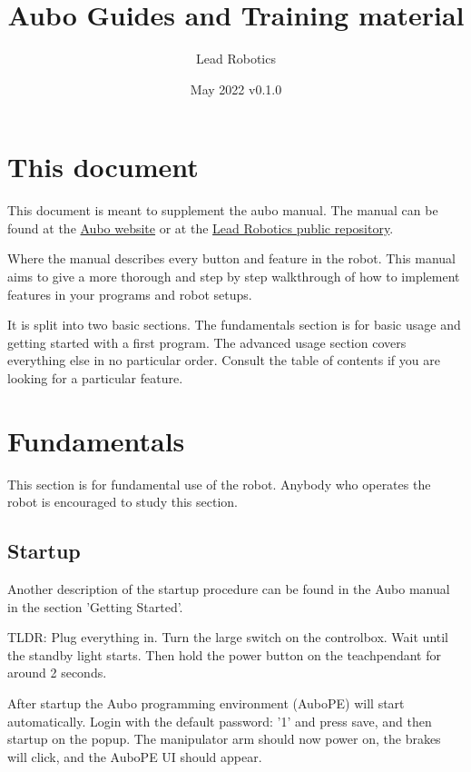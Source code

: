 \documentclass{article}
\title{Aubo Guides and Training material}
\author{Lead Robotics}
\date{May 2022 v0.1.0}
\begin{document}
\maketitle

\tableofcontents

\section{This document} 
This document is meant to supplement the aubo manual. The manual can be found at the \href{https://github.com/MalteNJLead/LeadPublic/tree/main/Aubo}{Aubo website} or at the \href{https://github.com/MalteNJLead/LeadPublic/tree/main/Aubo}{Lead Robotics public repository}.

Where the manual describes every button and feature in the robot. This manual aims to give a more thorough and step by step walkthrough of how to implement features in your programs and robot setups.
  
It is split into two basic sections. The fundamentals section is for basic usage and getting started with a first program. The advanced usage section covers everything else in no particular order. Consult the table of contents if you are looking for a particular feature. 

\section{Fundamentals}
This  section is for fundamental use of the robot. Anybody who operates the robot is encouraged to study this section. 

\subsection{Startup}
\label{subsec:Startup}
Another description of the startup procedure can be found in the Aubo manual in the section 'Getting Started'.

TLDR: Plug everything in. Turn the large switch on the controlbox. Wait until the standby light starts. Then hold the power button on the teachpendant for around 2 seconds. 

After startup the Aubo programming environment (AuboPE) will start automatically. Login with the default password: '1' and press save, and then startup on the popup. The manipulator arm should now power on, the brakes will click, and the AuboPE UI should appear.  
\end{document}
